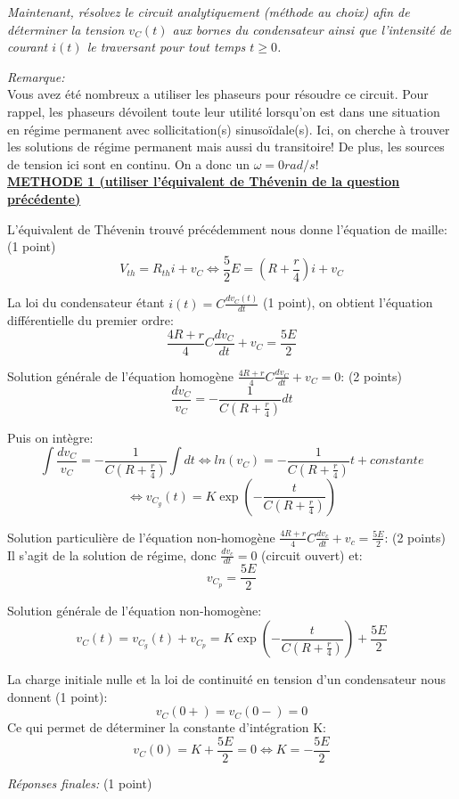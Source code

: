 \Question
{
\textit{Maintenant, résolvez le circuit analytiquement (méthode au choix) afin de déterminer la tension $v_C(t)$ aux bornes du condensateur ainsi que l'intensité de courant $i(t)$ le traversant pour tout temps $t\geq0$.}
}
{
\textit{Remarque:}\\
Vous avez été nombreux a utiliser les phaseurs pour résoudre ce circuit. Pour rappel, les phaseurs dévoilent toute leur utilité lorsqu'on est dans une situation en régime permanent avec sollicitation(s) sinusoïdale(s). Ici, on cherche à trouver les solutions de régime permanent mais aussi du transitoire! De plus, les sources de tension ici sont en continu. On a donc un $\omega=0 rad/s$!\\

\underline{\textbf{METHODE 1 (utiliser l'équivalent de Thévenin de la question précédente)}}

L'équivalent de Thévenin trouvé précédemment nous donne l'équation de maille:  (1 point)
$$V_{th}=R_{th}i+v_C \Leftrightarrow \frac{5}{2}E=(R+\frac{r}{4})i+v_C$$

La loi du condensateur étant $i(t)=C\frac{dv_C(t)}{dt}$ (1 point), on obtient l'équation différentielle du premier ordre:
$$\frac{4R+r}{4}C \frac{dv_C}{dt}+v_C=\frac{5E}{2}$$

Solution générale de l'équation homogène $\frac{4R+r}{4}C\frac{dv_C}{dt}+v_C=0$: (2 points)
$$\frac{dv_C}{v_C}=-\frac{1}{C(R+\frac{r}{4})}dt$$

Puis on intègre:\\
$$\int \frac{dv_C}{v_C}=-\frac{1}{C(R+\frac{r}{4})}\int dt \Leftrightarrow ln(v_C)=-\frac{1}{C(R+\frac{r}{4})}t+constante$$
$$\Leftrightarrow v_{C_g}(t)=K \exp{(-\frac{t}{C(R+\frac{r}{4})})}$$

Solution particulière de l'équation non-homogène $\frac{4R+r}{4}C\frac{dv_c}{dt}+v_c=\frac{5E}{2}$:  (2 points)\\
Il s'agit de la solution de régime, donc $\frac{dv_c}{dt}=0$ (circuit ouvert) et:
$$v_{C_p}=\frac{5E}{2}$$

Solution générale de l'équation non-homogène:
$$v_C(t)= v_{C_g}(t)+v_{C_p}=K \exp{(-\frac{t}{C(R+\frac{r}{4})})}+\frac{5E}{2}$$

La charge initiale nulle et la loi de continuité en tension d'un condensateur nous donnent (1 point):
$$v_C(0+)=v_C(0-)=0$$
Ce qui permet de déterminer la constante d'intégration K:
$$v_C(0)=K+\frac{5E}{2}=0 \Leftrightarrow K=-\frac{5E}{2}$$

\textit{Réponses finales:} (1 point)

}
